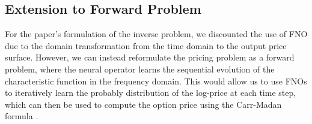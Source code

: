 \documentclass{article}
\begin{document}
\subsection{Extension to Forward Problem}
For the paper's formulation of the inverse problem, we discounted the use of FNO due to the domain transformation from the time domain to the output price surface. However, we can instead reformulate the pricing problem as a forward problem, where the neural operator learns the sequential evolution of the characteristic function in the frequency domain. This would allow us to use FNOs to iteratively learn the probably distribution of the log-price at each time step, which can then be used to compute the option price using the Carr-Madan formula \citep{carr2001}.



\end{document}

